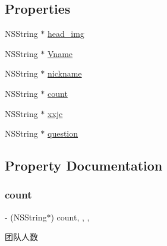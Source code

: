 \subsection*{Properties}
\begin{DoxyCompactItemize}
\item 
N\+S\+String $\ast$ \mbox{\hyperlink{interface_f_n_partner_center_model_af22f645f2d59c8e771d108083098fe40}{head\+\_\+img}}
\item 
N\+S\+String $\ast$ \mbox{\hyperlink{interface_f_n_partner_center_model_ae959df4194d7f3fa6de77138f280e92f}{Vname}}
\item 
N\+S\+String $\ast$ \mbox{\hyperlink{interface_f_n_partner_center_model_a6c5c6953dd94fb5adc40a68e4e01aed3}{nickname}}
\item 
N\+S\+String $\ast$ \mbox{\hyperlink{interface_f_n_partner_center_model_a4cc606809e8055401f04fde9deaebd5e}{count}}
\item 
N\+S\+String $\ast$ \mbox{\hyperlink{interface_f_n_partner_center_model_adc749d6d3c607bcbbb0d992b58f86584}{xxjc}}
\item 
N\+S\+String $\ast$ \mbox{\hyperlink{interface_f_n_partner_center_model_af0e3bd42ee7394a06163bef9188bada2}{question}}
\end{DoxyCompactItemize}


\subsection{Property Documentation}
\mbox{\label{interface_f_n_partner_center_model_a4cc606809e8055401f04fde9deaebd5e}} 
\subsubsection{\texorpdfstring{count}{count}}
{\footnotesize\ttfamily -\/ (N\+S\+String$\ast$) count\hspace{0.3cm}{\ttfamily [read]}, {\ttfamily [write]}, {\ttfamily [nonatomic]}, {\ttfamily [copy]}}

团队人数 \mbox{\label{interface_f_n_partner_center_model_af22f645f2d59c8e771d108083098fe40}} 
